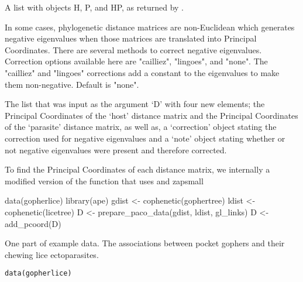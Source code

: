 \documentclass[letterpaper]{book}
\begin{document}
\begin{Arguments}
\begin{ldescription}
\item[\code{D}] A list with objects H, P, and HP, as returned by .

\item[\code{correction}] In some cases, phylogenetic distance matrices are non-Euclidean which generates negative eigenvalues when those matrices are translated into Principal Coordinates. There are several methods to correct negative eigenvalues. Correction options available here are "cailliez", "lingoes", and "none". The "cailliez" and "lingoes" corrections add a constant to the eigenvalues to make them non-negative. Default is "none".
\end{ldescription}
\end{Arguments}
%
\begin{Value}
The list that was input as the argument `D' with four new elements; the Principal Coordinates of the `host' distance matrix and the Principal Coordinates of the `parasite' distance matrix, as well as, a `correction' object stating the correction used for negative eigenvalues and a `note' object stating whether or not negative eigenvalues were present and therefore corrected.
\end{Value}
%
\begin{Note}\relax
To find the Principal Coordinates of each distance matrix, we internally a modified version of the function  that uses  and zapsmall
\end{Note}
%
\begin{Examples}
\begin{ExampleCode}
data(gopherlice)
library(ape)
gdist <- cophenetic(gophertree)
ldist <- cophenetic(licetree)
D <- prepare_paco_data(gdist, ldist, gl_links)
D <- add_pcoord(D)
\end{ExampleCode}
\end{Examples}
%
\begin{Description}\relax
One part of example data. The associations between pocket gophers and their chewing lice ectoparasites.
\end{Description}
%
\begin{Usage}
\begin{verbatim}
data(gopherlice)
\end{verbatim}
\end{Usage}
\end{document}
